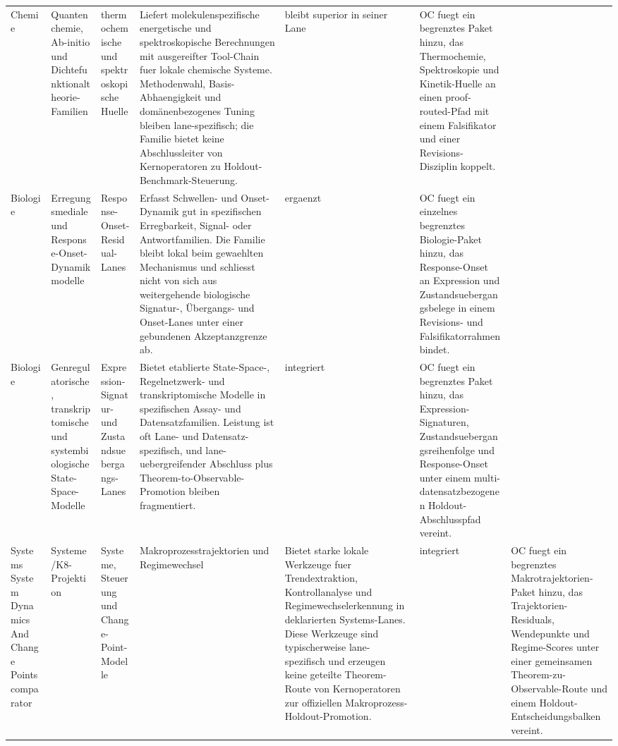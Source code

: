 \begin{longtable}{@{}L{0.09\textwidth}L{0.14\textwidth}L{0.12\textwidth}L{0.23\textwidth}L{0.12\textwidth}L{0.22\textwidth}@{}}
Chemie & Quantenchemie, Ab-initio und Dichtefunktionaltheorie-Familien & thermochemische und spektroskopische Huelle & Liefert molekulenspezifische energetische und spektroskopische Berechnungen mit ausgereifter Tool-Chain fuer lokale chemische Systeme. \allowbreak Methodenwahl, Basis-Abhaengigkeit und domänenbezogenes Tuning bleiben lane-spezifisch; die Familie bietet keine Abschlussleiter von Kernoperatoren zu Holdout-Benchmark-Steuerung. & bleibt superior in seiner Lane & OC fuegt ein begrenztes Paket hinzu, das Thermochemie, Spektroskopie und Kinetik-Huelle an einen proof-routed-Pfad mit einem Falsifikator und einer Revisions-Disziplin koppelt. \\
Biologie & Erregungsmediale und Response-Onset-Dynamikmodelle & Response-Onset-Residual-Lanes & Erfasst Schwellen- und Onset-Dynamik gut in spezifischen Erregbarkeit, Signal- oder Antwortfamilien. \allowbreak Die Familie bleibt lokal beim gewaehlten Mechanismus und schliesst nicht von sich aus weitergehende biologische Signatur-, Übergangs- und Onset-Lanes unter einer gebundenen Akzeptanzgrenze ab. & ergaenzt & OC fuegt ein einzelnes begrenztes Biologie-Paket hinzu, das Response-Onset an Expression und Zustandsuebergangsbelege in einem Revisions- und Falsifikatorrahmen bindet. \\
Biologie & Genregulatorische, transkriptomische und systembiologische State-Space-Modelle & Expression-Signatur- und Zustandsuebergangs-Lanes & Bietet etablierte State-Space-, Regelnetzwerk- und transkriptomische Modelle in spezifischen Assay- und Datensatzfamilien. \allowbreak Leistung ist oft Lane- und Datensatz-spezifisch, und lane-uebergreifender Abschluss plus Theorem-to-Observable-Promotion bleiben fragmentiert. & integriert & OC fuegt ein begrenztes Paket hinzu, das Expression-Signaturen, Zustandsuebergangsreihenfolge und Response-Onset unter einem multi-datensatzbezogenen Holdout-Abschlusspfad vereint. \\
Systems System Dynamics And Change Points comparator & Systeme /\allowbreak K8-Projektion & Systeme, Steuerung und Change-Point-Modelle & Makroprozesstrajektorien und Regimewechsel & Bietet starke lokale Werkzeuge fuer Trendextraktion, Kontrollanalyse und Regimewechselerkennung in deklarierten Systems-Lanes. \allowbreak Diese Werkzeuge sind typischerweise lane-spezifisch und erzeugen keine geteilte Theorem-Route von Kernoperatoren zur offiziellen Makroprozess-Holdout-Promotion. & integriert & OC fuegt ein begrenztes Makrotrajektorien-Paket hinzu, das Trajektorien-Residuals, Wendepunkte und Regime-Scores unter einer gemeinsamen Theorem-zu-Observable-Route und einem Holdout-Entscheidungsbalken vereint. \\

\end{longtable}
